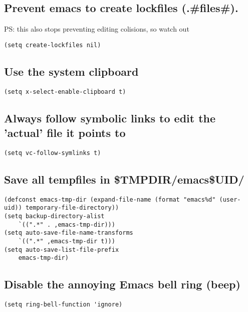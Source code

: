 \documentclass[11pt]{article}
\begin{document}
\subsection*{Prevent emacs to create lockfiles (.\#files\#).}
\label{sec:org6c511cc}

PS: this also stops preventing editing colisions, so watch out
\begin{verbatim}
(setq create-lockfiles nil)
\end{verbatim}

\subsection*{Use the system clipboard}
\label{sec:org6553b2d}
\begin{verbatim}
(setq x-select-enable-clipboard t)
\end{verbatim}

\subsection*{Always follow symbolic links to edit the 'actual' file it points to}
\label{sec:orgd6666e0}

\begin{verbatim}
(setq vc-follow-symlinks t)
\end{verbatim}

\subsection*{Save all tempfiles in \$TMPDIR/emacs\$UID/}
\label{sec:org191a788}

\begin{verbatim}
(defconst emacs-tmp-dir (expand-file-name (format "emacs%d" (user-uid)) temporary-file-directory))
(setq backup-directory-alist
    `((".*" . ,emacs-tmp-dir)))
(setq auto-save-file-name-transforms
    `((".*" ,emacs-tmp-dir t)))
(setq auto-save-list-file-prefix
    emacs-tmp-dir)
\end{verbatim}

\subsection*{Disable the annoying Emacs bell ring (beep)}
\label{sec:org5f572a8}

\begin{verbatim}
(setq ring-bell-function 'ignore)
\end{verbatim}
\end{document}
